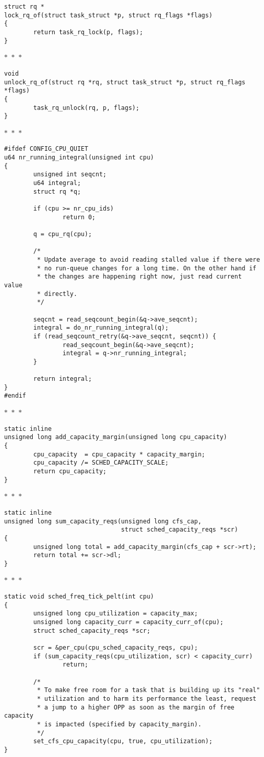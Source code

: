\documentclass{article}
\newcommand{\divider}{{\begin{center}
  $\ast$~$\ast$~$\ast$
\end{center}}}
\begin{document}
\begin{verbatim}
struct rq *
lock_rq_of(struct task_struct *p, struct rq_flags *flags)
{
        return task_rq_lock(p, flags);
}
\end{verbatim}
\divider
\begin{verbatim}
void
unlock_rq_of(struct rq *rq, struct task_struct *p, struct rq_flags *flags)
{
        task_rq_unlock(rq, p, flags);
}
\end{verbatim}
\divider
\begin{verbatim}
#ifdef CONFIG_CPU_QUIET
u64 nr_running_integral(unsigned int cpu)
{
        unsigned int seqcnt;
        u64 integral;
        struct rq *q;

        if (cpu >= nr_cpu_ids)
                return 0;

        q = cpu_rq(cpu);

        /*
         * Update average to avoid reading stalled value if there were
         * no run-queue changes for a long time. On the other hand if
         * the changes are happening right now, just read current value
         * directly.
         */

        seqcnt = read_seqcount_begin(&q->ave_seqcnt);
        integral = do_nr_running_integral(q);
        if (read_seqcount_retry(&q->ave_seqcnt, seqcnt)) {
                read_seqcount_begin(&q->ave_seqcnt);
                integral = q->nr_running_integral;
        }

        return integral;
}
#endif
\end{verbatim}
\divider
\begin{verbatim}
static inline
unsigned long add_capacity_margin(unsigned long cpu_capacity)
{
        cpu_capacity  = cpu_capacity * capacity_margin;
        cpu_capacity /= SCHED_CAPACITY_SCALE;
        return cpu_capacity;
}
\end{verbatim}
\divider
\begin{verbatim}
static inline
unsigned long sum_capacity_reqs(unsigned long cfs_cap,
                                struct sched_capacity_reqs *scr)
{
        unsigned long total = add_capacity_margin(cfs_cap + scr->rt);
        return total += scr->dl;
}
\end{verbatim}
\divider
\begin{verbatim}
static void sched_freq_tick_pelt(int cpu)
{
        unsigned long cpu_utilization = capacity_max;
        unsigned long capacity_curr = capacity_curr_of(cpu);
        struct sched_capacity_reqs *scr;

        scr = &per_cpu(cpu_sched_capacity_reqs, cpu);
        if (sum_capacity_reqs(cpu_utilization, scr) < capacity_curr)
                return;

        /*
         * To make free room for a task that is building up its "real"
         * utilization and to harm its performance the least, request
         * a jump to a higher OPP as soon as the margin of free capacity
         * is impacted (specified by capacity_margin).
         */
        set_cfs_cpu_capacity(cpu, true, cpu_utilization);
}
\end{verbatim}
\end{document}
